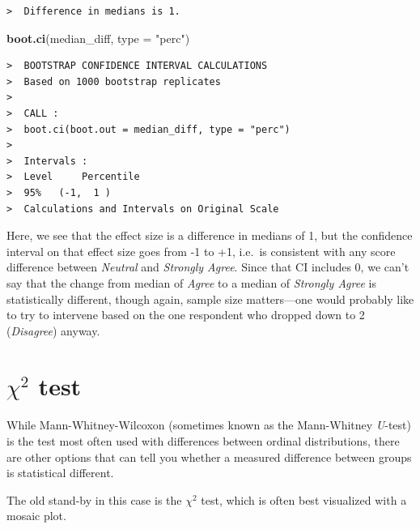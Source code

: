\documentclass[]{book}
\newenvironment{Shaded}{\begin{snugshade}}{\end{snugshade}}
\newcommand{\KeywordTok}[1]{\textcolor[rgb]{0.13,0.29,0.53}{\textbf{{#1}}}}
\newcommand{\DataTypeTok}[1]{\textcolor[rgb]{0.13,0.29,0.53}{{#1}}}
\newcommand{\StringTok}[1]{\textcolor[rgb]{0.31,0.60,0.02}{{#1}}}
\newcommand{\NormalTok}[1]{{#1}}
\begin{document}
\begin{verbatim}
>  Difference in medians is 1.
\end{verbatim}

\begin{Shaded}
\begin{Highlighting}[]
\KeywordTok{boot.ci}\NormalTok{(median_diff, }\DataTypeTok{type =} \StringTok{"perc"}\NormalTok{) }
\end{Highlighting}
\end{Shaded}

\begin{verbatim}
>  BOOTSTRAP CONFIDENCE INTERVAL CALCULATIONS
>  Based on 1000 bootstrap replicates
>  
>  CALL : 
>  boot.ci(boot.out = median_diff, type = "perc")
>  
>  Intervals : 
>  Level     Percentile     
>  95%   (-1,  1 )  
>  Calculations and Intervals on Original Scale
\end{verbatim}

Here, we see that the effect size is a difference in medians of 1, but
the confidence interval on that effect size goes from -1 to +1, i.e.~is
consistent with any score difference between \emph{Neutral} and
\emph{Strongly Agree}. Since that CI includes 0, we can't say that the
change from median of \emph{Agree} to a median of \emph{Strongly Agree}
is statistically different, though again, sample size matters---one
would probably like to try to intervene based on the one respondent who
dropped down to 2 (\emph{Disagree}) anyway.

\section{\texorpdfstring{\(\chi^2\)
test}{\textbackslash{}chi\^{}2 test}}\label{chi2-test}

While Mann-Whitney-Wilcoxon (sometimes known as the Mann-Whitney
\emph{U}-test) is the test most often used with differences between
ordinal distributions, there are other options that can tell you whether
a measured difference between groups is statistical different.

The old stand-by in this case is the \(\chi^2\) test, which is often
best visualized with a mosaic plot.
\end{document}
